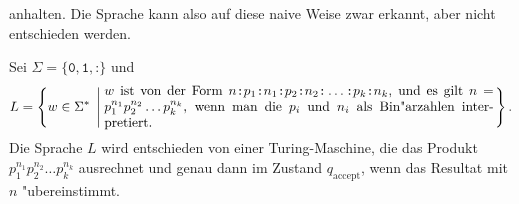 \begin{loesung}
\begin{teilaufgaben}
anhalten. Die Sprache kann also auf diese naive Weise zwar erkannt, aber
nicht entschieden werden.
\item 
Sei $\Sigma=\{\texttt{0},\texttt{1},\texttt{:}\}$ und 
\[
L=\left\{ w\in\Sigma^*\;\left|\;
\begin{minipage}{4truein}
$w$ ist von der Form
$n\texttt{:}p_1\texttt{:}n_1\texttt{:}p_2\texttt{:}n_2\texttt{:}\dots\texttt{:}p_k\texttt{:}n_k$, und es gilt $n=p_1^{n_1}p_2^{n_2}\dots p_k^{n_k}$,
wenn man die $p_i$ und $n_i$ als Bin"arzahlen interpretiert.
\end{minipage}
\right.\right\}.
\]
Die Sprache $L$ wird entschieden von einer Turing-Maschine, die das Produkt
$p_1^{n_1}p_2^{n_2}\dots p_k^{n_k}$ ausrechnet und genau dann im Zustand
$q_{\text{accept}}$, wenn das Resultat mit $n$ "ubereinstimmt.
\end{teilaufgaben}
\end{loesung}

